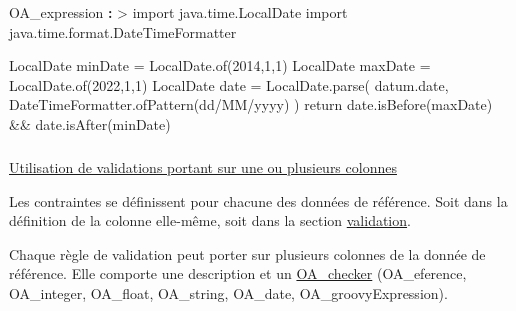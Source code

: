 \documentclass[
  letterpaper,
  DIV=11,
  numbers=noendperiod]{scrartcl}
\makeatletter
\let\oldsubparagraph\subparagraph
\renewcommand{\subparagraph}{
    \@ifstar
      \xxxSubParagraphStar
      \xxxSubParagraphNoStar
  }
\newcommand{\xxxSubParagraphStar}[1]{\oldsubparagraph*{#1}\mbox{}}
\newcommand{\xxxSubParagraphNoStar}[1]{\oldsubparagraph{#1}\mbox{}}
\newenvironment{Shaded}{\begin{snugshade}}{\end{snugshade}}
\newcommand{\CharTok}[1]{\textcolor[rgb]{0.13,0.47,0.30}{#1}}
\newcommand{\FunctionTok}[1]{\textcolor[rgb]{0.28,0.35,0.67}{#1}}
\newcommand{\KeywordTok}[1]{\textcolor[rgb]{0.00,0.23,0.31}{\textbf{#1}}}
\newcommand{\NormalTok}[1]{\textcolor[rgb]{0.00,0.23,0.31}{#1}}
\makeatother
\begin{document}
\begin{Shaded}
\begin{Highlighting}[]
\FunctionTok{       OA\_expression }\KeywordTok{: }\CharTok{\textgreater{}}
\NormalTok{          import java.time.LocalDate}
\NormalTok{          import java.time.format.DateTimeFormatter}

\NormalTok{          LocalDate minDate = LocalDate.of(2014,1,1)}
\NormalTok{          LocalDate maxDate = LocalDate.of(2022,1,1)}
\NormalTok{          LocalDate date = LocalDate.parse(}
\NormalTok{            datum.date,}
\NormalTok{            DateTimeFormatter.ofPattern(\textquotesingle{}dd/MM/yyyy\textquotesingle{})}
\NormalTok{          )}
\NormalTok{          return date.isBefore(maxDate) \&\& date.isAfter(minDate)}
\end{Highlighting}
\end{Shaded}

\subparagraph{\texorpdfstring{\hyperref[dataChecker]{Utilisation de
validations portant sur une ou plusieurs
colonnes}}{Utilisation de validations portant sur une ou plusieurs colonnes}}\label{utilisation-de-validations-portant-sur-une-ou-plusieurs-colonnes}

Les contraintes se définissent pour chacune des données de référence.
Soit dans la définition de la colonne elle-même, soit dans la section
\hyperref[referencesValidation]{validation}.

Chaque règle de validation peut porter sur plusieurs colonnes de la
donnée de référence. Elle comporte une description et un
\hyperref[dataChecker]{OA\_checker} (OA\_eference, OA\_integer,
OA\_float, OA\_string, OA\_date, OA\_groovyExpression).
\end{document}
